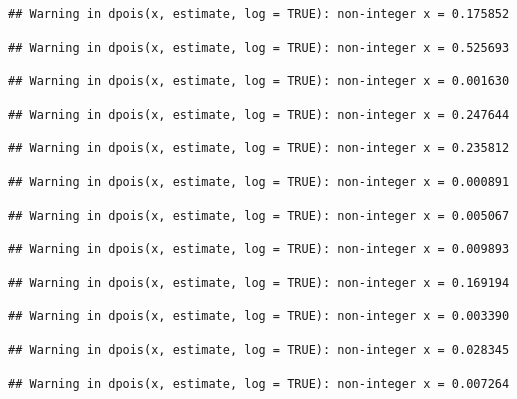 \documentclass[]{article}
\begin{document}
\begin{verbatim}
## Warning in dpois(x, estimate, log = TRUE): non-integer x = 0.175852
\end{verbatim}

\begin{verbatim}
## Warning in dpois(x, estimate, log = TRUE): non-integer x = 0.525693
\end{verbatim}

\begin{verbatim}
## Warning in dpois(x, estimate, log = TRUE): non-integer x = 0.001630
\end{verbatim}

\begin{verbatim}
## Warning in dpois(x, estimate, log = TRUE): non-integer x = 0.247644
\end{verbatim}

\begin{verbatim}
## Warning in dpois(x, estimate, log = TRUE): non-integer x = 0.235812
\end{verbatim}

\begin{verbatim}
## Warning in dpois(x, estimate, log = TRUE): non-integer x = 0.000891
\end{verbatim}

\begin{verbatim}
## Warning in dpois(x, estimate, log = TRUE): non-integer x = 0.005067
\end{verbatim}

\begin{verbatim}
## Warning in dpois(x, estimate, log = TRUE): non-integer x = 0.009893
\end{verbatim}

\begin{verbatim}
## Warning in dpois(x, estimate, log = TRUE): non-integer x = 0.169194
\end{verbatim}

\begin{verbatim}
## Warning in dpois(x, estimate, log = TRUE): non-integer x = 0.003390
\end{verbatim}

\begin{verbatim}
## Warning in dpois(x, estimate, log = TRUE): non-integer x = 0.028345
\end{verbatim}

\begin{verbatim}
## Warning in dpois(x, estimate, log = TRUE): non-integer x = 0.007264
\end{verbatim}
\end{document}
